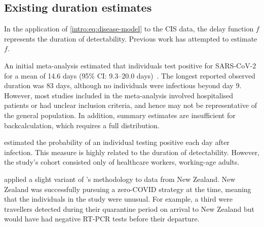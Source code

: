 \documentclass[thesis.tex]{subfiles}
\begin{document}
\subsection{Existing duration estimates} \label{intro:sec:previous-duration-estimates}

In the application of \cref{intro:eq:disease-model} to the CIS data, the delay function $f$ represents the duration of detectability.
Previous work has attempted to estimate $f$.

An initial meta-analysis estimated that individuals test positive for SARS-CoV-2 for a mean of 14.6 days (95\% CI: 9.3--20.0 days)~\autocite{cevikShedding}.
The longest reported observed duration was 83 days, although no individuals were infectious beyond day 9.
However, most studies included in the meta-analysis involved hospitalised patients or had unclear inclusion criteria, and hence may not be representative of the general population.
In addition, summary estimates are insufficient for backcalculation, which requires a full distribution.

\Textcite{hellewellPCRSensitivity} estimated the probability of an individual testing positive each day after infection.
This measure is highly related to the duration of detectability.
However, the study's cohort consisted only of healthcare workers, \ie working-age adults.

\Textcite{binnySensitivity} applied a slight variant of \textcite{hellewellPCRSensitivity}'s methodology to data from New Zealand.
New Zealand was successfully pursuing a zero-COVID strategy at the time, meaning that the individuals in the study were unusual.
For example, a third were travellers detected during their quarantine period on arrival to New Zealand but would have had negative RT-PCR tests before their departure.
\end{document}

